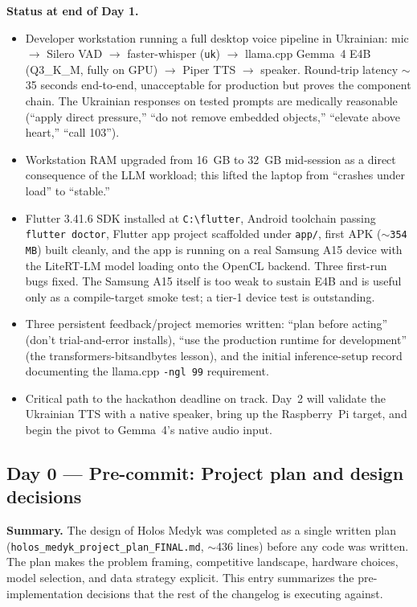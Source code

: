 \documentclass{article}
\theoremstyle{plain}
\theoremstyle{definition}
\theoremstyle{remark}
\begin{document}
\textbf{Status at end of Day 1.}
\begin{itemize}
\item Developer workstation running a full desktop voice pipeline in Ukrainian: mic $\rightarrow$ Silero VAD $\rightarrow$ faster-whisper (\texttt{uk}) $\rightarrow$ llama.cpp Gemma~4 E4B (Q3\_K\_M, fully on GPU) $\rightarrow$ Piper TTS $\rightarrow$ speaker. Round-trip latency $\sim$35 seconds end-to-end, unacceptable for production but proves the component chain. The Ukrainian responses on tested prompts are medically reasonable (``apply direct pressure,'' ``do not remove embedded objects,'' ``elevate above heart,'' ``call 103'').
\item Workstation RAM upgraded from 16~GB to 32~GB mid-session as a direct consequence of the LLM workload; this lifted the laptop from ``crashes under load'' to ``stable.''
\item Flutter 3.41.6 SDK installed at \texttt{C:\textbackslash flutter}, Android toolchain passing \texttt{flutter doctor}, Flutter app project scaffolded under \texttt{app/}, first APK (\texttt{$\sim$354 MB}) built cleanly, and the app is running on a real Samsung A15 device with the LiteRT-LM model loading onto the OpenCL backend. Three first-run bugs fixed. The Samsung A15 itself is too weak to sustain E4B and is useful only as a compile-target smoke test; a tier-1 device test is outstanding.
\item Three persistent feedback/project memories written: ``plan before acting'' (don't trial-and-error installs), ``use the production runtime for development'' (the transformers-bitsandbytes lesson), and the initial inference-setup record documenting the llama.cpp \texttt{-ngl 99} requirement.
\item Critical path to the hackathon deadline on track. Day~2 will validate the Ukrainian TTS with a native speaker, bring up the Raspberry~Pi target, and begin the pivot to Gemma~4's native audio input.
\end{itemize}

\subsection*{Day 0 --- Pre-commit: Project plan and design decisions}

\textbf{Summary.} The design of Holos Medyk was completed as a single written plan (\texttt{holos\_medyk\_project\_plan\_FINAL.md}, $\sim$436 lines) before any code was written. The plan makes the problem framing, competitive landscape, hardware choices, model selection, and data strategy explicit. This entry summarizes the pre-implementation decisions that the rest of the changelog is executing against.
\end{document}
